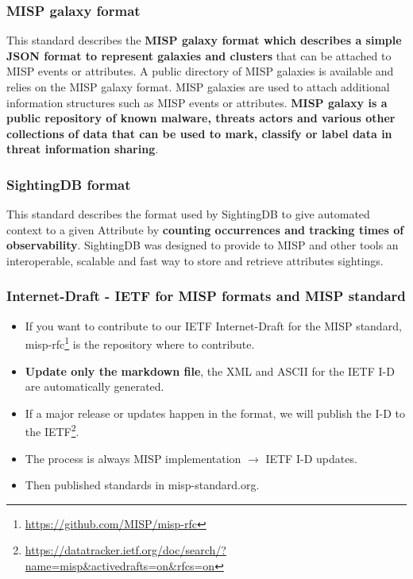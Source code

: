 \begin{frame}[fragile]
       \frametitle{MISP galaxy format}
        This standard describes the {\bf MISP galaxy format which describes a simple JSON format to represent galaxies and clusters} that can be attached to MISP events or attributes. A public directory of MISP galaxies is available and relies on the MISP galaxy format. MISP galaxies are used to attach additional information structures such as MISP events or attributes. {\bf MISP galaxy is a public repository of known malware, threats actors and various other collections of data that can be used to mark, classify or label data in threat information sharing}.
\end{frame}

\begin{frame}[fragile]
        \frametitle{SightingDB format}
        This standard describes the format used by SightingDB to give automated context to a given Attribute by {\bf counting occurrences and tracking times of observability}. SightingDB was designed to provide to MISP and other tools an interoperable, scalable and fast way to store and retrieve attributes sightings.
\end{frame}


\begin{frame}[fragile]
\frametitle{Internet-Draft - IETF for MISP formats and MISP standard}
\begin{itemize}
\item If you want to contribute to our IETF Internet-Draft for the MISP standard, misp-rfc\footnote{\url{https://github.com/MISP/misp-rfc}} is the repository where to contribute.
\item {\bf Update only the markdown file}, the XML and ASCII for the IETF I-D are automatically generated.
\item If a major release or updates happen in the format, we will publish the I-D to the IETF\footnote{\url{https://datatracker.ietf.org/doc/search/?name=misp&activedrafts=on&rfcs=on}}.
\item The process is always MISP implementation $\rightarrow$ IETF I-D updates.
\item Then published standards in misp-standard.org.
\end{itemize}

\end{frame}



